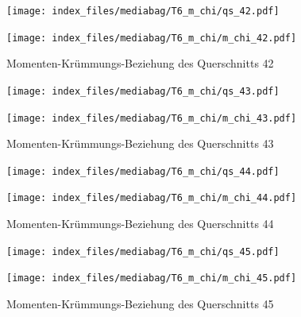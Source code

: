 \documentclass[
  11pt,
  letterpaper,
]{scrreprt}
\begin{document}
\begin{figure}[H]

\begin{minipage}{0.50\linewidth}
\texttt{[image: index\_files/mediabag/T6\_m\_chi/qs\_42.pdf]}\end{minipage}%
%
\begin{minipage}{0.50\linewidth}
\texttt{[image: index\_files/mediabag/T6\_m\_chi/m\_chi\_42.pdf]}\end{minipage}%

\caption{\label{fig-mchi_anhang}Momenten-Krümmungs-Beziehung des
Querschnitts 42}

\end{figure}%

\begin{figure}[H]

\begin{minipage}{0.50\linewidth}
\texttt{[image: index\_files/mediabag/T6\_m\_chi/qs\_43.pdf]}\end{minipage}%
%
\begin{minipage}{0.50\linewidth}
\texttt{[image: index\_files/mediabag/T6\_m\_chi/m\_chi\_43.pdf]}\end{minipage}%

\caption{\label{fig-mchi_anhang}Momenten-Krümmungs-Beziehung des
Querschnitts 43}

\end{figure}%

\begin{figure}[H]

\begin{minipage}{0.50\linewidth}
\texttt{[image: index\_files/mediabag/T6\_m\_chi/qs\_44.pdf]}\end{minipage}%
%
\begin{minipage}{0.50\linewidth}
\texttt{[image: index\_files/mediabag/T6\_m\_chi/m\_chi\_44.pdf]}\end{minipage}%

\caption{\label{fig-mchi_anhang}Momenten-Krümmungs-Beziehung des
Querschnitts 44}

\end{figure}%

\begin{figure}[H]

\begin{minipage}{0.50\linewidth}
\texttt{[image: index\_files/mediabag/T6\_m\_chi/qs\_45.pdf]}\end{minipage}%
%
\begin{minipage}{0.50\linewidth}
\texttt{[image: index\_files/mediabag/T6\_m\_chi/m\_chi\_45.pdf]}\end{minipage}%

\caption{\label{fig-mchi_anhang}Momenten-Krümmungs-Beziehung des
Querschnitts 45}

\end{figure}%
\end{document}
